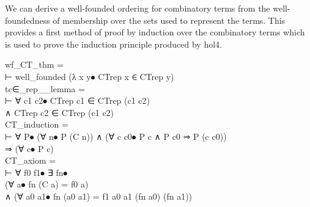 We can derive a well-founded ordering for combinatory terms from the well-foundedness of membership over the sets used to represent the terms.
This provides a first method of proof by induction over the combinatory terms which is used to prove the induction principle produced by hol4.

\begin{GFT}{}
\+\PrNL{}wf\_CT\_thm\PrNN{} =\\
\+	⊢ well\_founded (λ x y⦁ CTrep x ∈ CTrep y)\\
\+\PrNL{}tc∈\_rep\_\_lemma\PrNN{} =\\
\+	⊢ ∀ c1 c2⦁ CTrep c1 ∈\PrJL{+} CTrep (c1  c2)\\
\+		∧ CTrep c2 ∈\PrJL{+} CTrep (c1  c2)\\
\+\PrNL{}CT\_induction\PrNN{} =\\
\+	⊢ ∀ P⦁ (∀ n⦁ P (C n)) ∧ (∀ c c0⦁ P c ∧ P c0 ⇒ P (c  c0))\\
\+		⇒ (∀ c⦁ P c)\\
\+\PrNL{}CT\_axiom\PrNN{} =\\
\+	⊢ ∀ f0 f1⦁ ∃ fn⦁\\
\+		(∀ a⦁ fn (C a) = f0 a)\\
\+           ∧	(∀ a0 a1⦁ fn (a0  a1) = f1 a0 a1 (fn a0) (fn a1))\\
\end{GFT}

